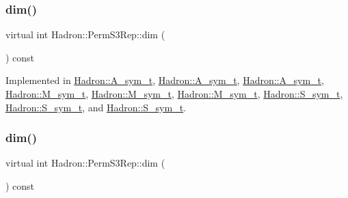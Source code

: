 \subsubsection{\texorpdfstring{dim()}{dim()}\hspace{0.1cm}{\footnotesize\ttfamily [1/2]}}
{\footnotesize\ttfamily virtual int Hadron\+::\+Perm\+S3\+Rep\+::dim (\begin{DoxyParamCaption}{ }\end{DoxyParamCaption}) const\hspace{0.3cm}{\ttfamily [pure virtual]}}



Implemented in \mbox{\hyperlink{structHadron_1_1A__sym__t_a57e9460ee09050859f969d1f0cae0e92}{Hadron\+::\+A\+\_\+sym\+\_\+t}}, \mbox{\hyperlink{structHadron_1_1A__sym__t_a57e9460ee09050859f969d1f0cae0e92}{Hadron\+::\+A\+\_\+sym\+\_\+t}}, \mbox{\hyperlink{structHadron_1_1A__sym__t_a57e9460ee09050859f969d1f0cae0e92}{Hadron\+::\+A\+\_\+sym\+\_\+t}}, \mbox{\hyperlink{structHadron_1_1M__sym__t_a9ee8ba6fd6c2220231052690b2995ed5}{Hadron\+::\+M\+\_\+sym\+\_\+t}}, \mbox{\hyperlink{structHadron_1_1M__sym__t_a9ee8ba6fd6c2220231052690b2995ed5}{Hadron\+::\+M\+\_\+sym\+\_\+t}}, \mbox{\hyperlink{structHadron_1_1M__sym__t_a9ee8ba6fd6c2220231052690b2995ed5}{Hadron\+::\+M\+\_\+sym\+\_\+t}}, \mbox{\hyperlink{structHadron_1_1S__sym__t_ae8b1558dc91f46f5d78de03f1e587dc0}{Hadron\+::\+S\+\_\+sym\+\_\+t}}, \mbox{\hyperlink{structHadron_1_1S__sym__t_ae8b1558dc91f46f5d78de03f1e587dc0}{Hadron\+::\+S\+\_\+sym\+\_\+t}}, and \mbox{\hyperlink{structHadron_1_1S__sym__t_ae8b1558dc91f46f5d78de03f1e587dc0}{Hadron\+::\+S\+\_\+sym\+\_\+t}}.

\mbox{\label{structHadron_1_1PermS3Rep_a4ce8c9c9367b6120769feae38d2f5372}} 
\subsubsection{\texorpdfstring{dim()}{dim()}\hspace{0.1cm}{\footnotesize\ttfamily [2/2]}}
{\footnotesize\ttfamily virtual int Hadron\+::\+Perm\+S3\+Rep\+::dim (\begin{DoxyParamCaption}{ }\end{DoxyParamCaption}) const\hspace{0.3cm}{\ttfamily [pure virtual]}}



